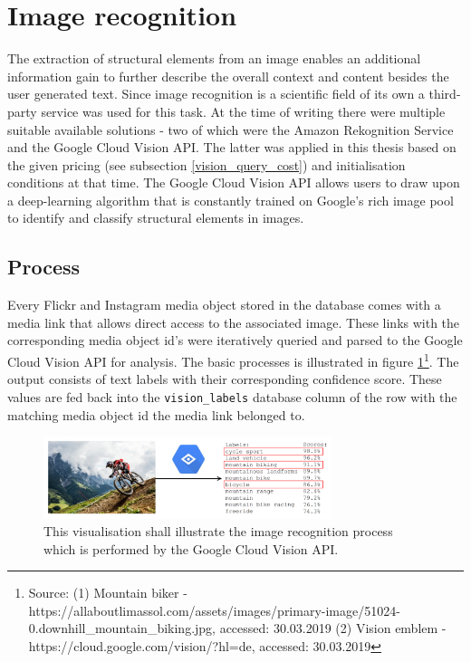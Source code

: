 \section{Image recognition} \label{image_recognition}
The extraction of structural elements from an image enables an additional information gain to further describe the overall context and content besides the user generated text. Since image recognition is a scientific field of its own a third-party service was used for this task. At the time of writing there were multiple suitable available solutions - two of which were the Amazon Rekognition Service and the Google Cloud Vision API. The latter was applied in this thesis based on the given pricing (see subsection \ref{vision_query_cost}) and initialisation conditions at that time. The Google Cloud Vision API allows users to draw upon a deep-learning algorithm that is constantly trained on Google's rich image pool to identify and classify structural elements in images.

\subsection{Process}
Every Flickr and Instagram media object stored in the database comes with a media link that allows direct access to the associated image. These links with the corresponding media object id's were iteratively queried and parsed to the Google Cloud Vision API for analysis. The basic processes is illustrated in figure \ref{fig:vision_illustration}\footnote{Source: (1) Mountain biker - https://allaboutlimassol.com/assets/images/primary-image/51024-0.downhill\_mountain\_biking.jpg, accessed: 30.03.2019 (2) Vision emblem - https://cloud.google.com/vision/?hl=de, accessed: 30.03.2019}. The output consists of text labels with their corresponding confidence score. These values are fed back into the \texttt{vision\_labels} database column of the row with the matching media object id the media link belonged to.

\begin{figure}[h!]
\centering
\includegraphics[width=0.75\textwidth]{img/vision_illustration}
\caption{This visualisation shall illustrate the image recognition process which is performed by the Google Cloud Vision API.}
\label{fig:vision_illustration}
\end{figure}

